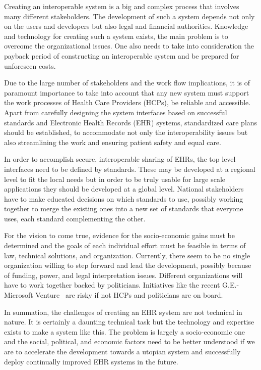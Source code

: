 \documentclass[14pt]{article}
\begin{document}
Creating an interoperable system is a big and complex process that involves many different stakeholders. The development of such a system depends not only on the users and developers but also legal and financial authorities. Knowledge and technology for creating such a system exists, the main problem is to overcome the organizational issues. One also needs to take into consideration the payback period of constructing an interoperable system and be prepared for unforeseen costs.

Due to the large number of stakeholders and the work flow implications, it is of paramount importance to take into account that any new system must support the work processes of Health Care Providers (HCPs), be reliable and accessible. Apart from carefully designing the system interfaces based on successful standards and Electronic Health Records (EHR) systems, standardized care plans should be established, to accommodate not only the interoperability issues but also streamlining the work and ensuring patient safety and equal care.


In order to accomplish secure, interoperable sharing of \glspl{EHR}, the \glspl{top level interface} need to be defined by standards. These may be developed at a regional level to fit the local needs but in order to be truly usable for large scale applications they should be developed at a global level. National stakeholders have to make educated decisions on which standards to use, possibly working together to merge the existing ones into a new set of standards that everyone uses, each standard complementing the other.

For the vision to come true, evidence for the socio-economic gains must be determined and the goals of each individual effort must be feasible in terms of law, technical solutions, and organization. Currently, there seem to be no single
organization willing to step forward and lead the development, possibly because of funding, power, and legal interpretation issues. Different organizations will have to work together backed by politicians. Initiatives like the recent G.E.-Microsoft Venture~\cite{Bits} are risky if not \glspl{HCP} and politicians are on board.

In summation, the challenges of creating an \gls{EHR} system are not technical in nature. It is certainly a daunting technical task but the technology and expertise exists to make a system like this. The problem is largely a socio-economic one and the social, political, and economic factors need to be better understood if we are to accelerate the development towards a utopian system and successfully deploy continually improved \gls{EHR} systems in the future.
\end{document}
